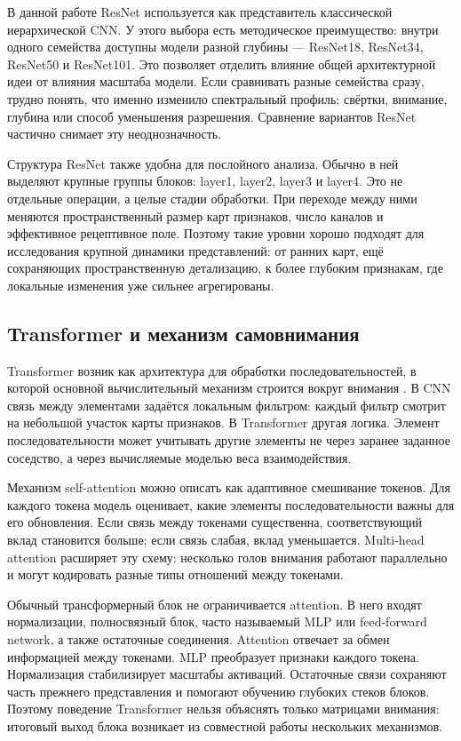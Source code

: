 В данной работе ResNet используется как представитель классической иерархической CNN. У этого выбора есть методическое преимущество: внутри одного семейства доступны модели разной глубины — ResNet18, ResNet34, ResNet50 и ResNet101. Это позволяет отделить влияние общей архитектурной идеи от влияния масштаба модели. Если сравнивать разные семейства сразу, трудно понять, что именно изменило спектральный профиль: свёртки, внимание, глубина или способ уменьшения разрешения. Сравнение вариантов ResNet частично снимает эту неоднозначность.

Структура ResNet также удобна для послойного анализа. Обычно в ней выделяют крупные группы блоков: layer1, layer2, layer3 и layer4. Это не отдельные операции, а целые стадии обработки. При переходе между ними меняются пространственный размер карт признаков, число каналов и эффективное рецептивное поле. Поэтому такие уровни хорошо подходят для исследования крупной динамики представлений: от ранних карт, ещё сохраняющих пространственную детализацию, к более глубоким признакам, где локальные изменения уже сильнее агрегированы.

\subsection{Transformer и механизм самовнимания}

Transformer возник как архитектура для обработки последовательностей, в которой основной вычислительный механизм строится вокруг внимания \cite{vaswani2017attention}. В CNN связь между элементами задаётся локальным фильтром: каждый фильтр смотрит на небольшой участок карты признаков. В Transformer другая логика. Элемент последовательности может учитывать другие элементы не через заранее заданное соседство, а через вычисляемые моделью веса взаимодействия.

Механизм self-attention можно описать как адаптивное смешивание токенов. Для каждого токена модель оценивает, какие элементы последовательности важны для его обновления. Если связь между токенами существенна, соответствующий вклад становится больше; если связь слабая, вклад уменьшается. Multi-head attention расширяет эту схему: несколько голов внимания работают параллельно и могут кодировать разные типы отношений между токенами.

Обычный трансформерный блок не ограничивается attention. В него входят нормализации, полносвязный блок, часто называемый MLP или feed-forward network, а также остаточные соединения. Attention отвечает за обмен информацией между токенами. MLP преобразует признаки каждого токена. Нормализация стабилизирует масштабы активаций. Остаточные связи сохраняют часть прежнего представления и помогают обучению глубоких стеков блоков. Поэтому поведение Transformer нельзя объяснять только матрицами внимания: итоговый выход блока возникает из совместной работы нескольких механизмов.

